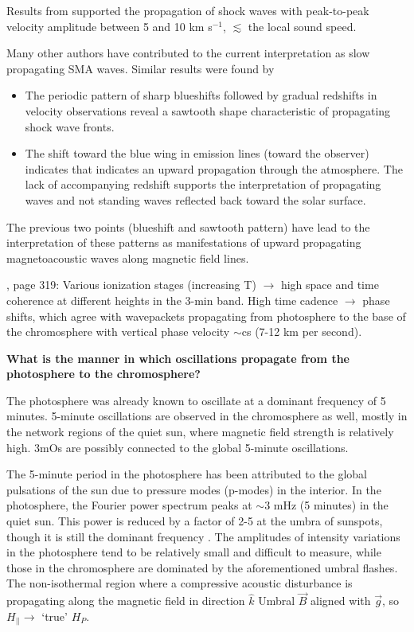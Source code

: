 Results from \cite{Tian2014} supported the propagation of shock waves with peak-to-peak
velocity amplitude between 5 and 10 km s$^{-1}$,
$\lesssim$ the local sound speed.

Many other authors have contributed to the
current interpretation as slow propagating SMA waves.
Similar results were found by
\cite{Brynildsen2004, Maltby1999,
DeMoortel2000}



\begin{itemize}
    \item The periodic pattern of
        sharp blueshifts followed by gradual redshifts
        in velocity observations reveal a
        sawtooth shape characteristic of propagating shock wave fronts.
    \item The shift toward the blue wing in emission lines (toward the
        observer) indicates that indicates an upward propagation through the
        atmosphere. The lack of accompanying redshift supports the
        interpretation of propagating waves and not standing waves reflected
        back toward the solar surface.
\end{itemize}

The previous two points (blueshift and sawtooth pattern)
have lead to
the interpretation of these patterns as manifestations of upward
propagating magnetoacoustic waves along magnetic field lines.



\cite{Bogdan2006}, page 319:
Various ionization stages (increasing T) $\rightarrow$ high space and time
coherence at different heights in the 3-min band.
High time cadence
$\rightarrow$ phase shifts, which agree with wavepackets propagating from
photosphere to the base of the chromosphere with vertical phase velocity
$\sim$cs (7-12 km per second).



\textbf{What is the manner in which oscillations propagate from the photosphere to
the chromosphere?}

The photosphere was already known to oscillate at a dominant frequency of 5
minutes.
5-minute oscillations are observed in the chromosphere as well, mostly in
the network regions of the quiet sun, where magnetic field strength is
relatively high.
3mOs are possibly connected to the global 5-minute oscillations.

The 5-minute period in the photosphere has been
attributed to the global pulsations of the sun due to pressure modes
(p-modes) in the interior. In the photosphere, the Fourier power spectrum
peaks at $\sim$3 mHz (5 minutes) in the quiet sun.
This power is reduced by a
factor of 2-5 at the umbra of sunspots, though it is still the dominant
frequency \citep{Felipe2010; Bogdan2006 p. 323}.
The amplitudes of intensity variations in the photosphere tend to be relatively
small and difficult to measure, while those in the chromosphere are
dominated by the aforementioned umbral flashes.
The non-isothermal region where a compressive acoustic disturbance is
propagating along the magnetic field in
direction $\hat{k}$
Umbral $\vec{B}$ aligned with $\vec{g}$, so $H_{||} \rightarrow$
`true' $H_{P}$.


